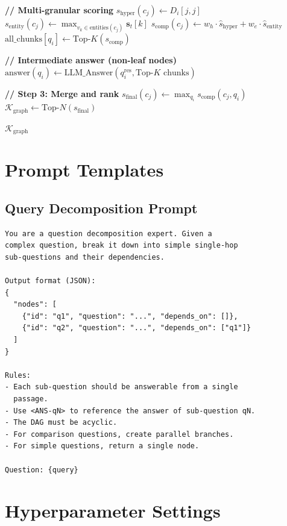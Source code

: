 \documentclass[11pt,a4paper]{article}
\begin{document}
\begin{algorithm}[ht]
\begin{algorithmic}[1]
    \State \textbf{// Multi-granular scoring}
        \State $s_{\text{hyper}}(c_j) \gets D_i[j,j]$
        \State $s_{\text{entity}}(c_j) \gets \max_{v_k \in \text{entities}(c_j)} \mathbf{s}_t[k]$
        \State $s_{\text{comp}}(c_j) \gets w_h \cdot \hat{s}_{\text{hyper}} + w_e \cdot \hat{s}_{\text{entity}}$ 
    \EndFor
    \State $\text{all\_chunks}[q_i] \gets \text{Top-}K(s_{\text{comp}})$
    
    \State \textbf{// Intermediate answer (non-leaf nodes)}
        \State $\text{answer}(q_i) \gets \text{LLM\_Answer}(q_i^{\text{res}}, \text{Top-}K \text{ chunks})$
    \EndIf
\EndFor

\State \textbf{// Step 3: Merge and rank}
\State $s_{\text{final}}(c_j) \gets \max_{q_i} s_{\text{comp}}(c_j, q_i)$
\State $\mathcal{K}_{\text{graph}} \gets \text{Top-}N(s_{\text{final}})$

\State \Return $\mathcal{K}_{\text{graph}}$
\end{algorithmic}
\end{algorithm}


\section{Prompt Templates}

\subsection{Query Decomposition Prompt}
\begin{verbatim}
You are a question decomposition expert. Given a 
complex question, break it down into simple single-hop 
sub-questions and their dependencies.

Output format (JSON):
{
  "nodes": [
    {"id": "q1", "question": "...", "depends_on": []},
    {"id": "q2", "question": "...", "depends_on": ["q1"]}
  ]
}

Rules:
- Each sub-question should be answerable from a single 
  passage.
- Use <ANS-qN> to reference the answer of sub-question qN.
- The DAG must be acyclic.
- For comparison questions, create parallel branches.
- For simple questions, return a single node.

Question: {query}
\end{verbatim}


\section{Hyperparameter Settings}
\end{document}
